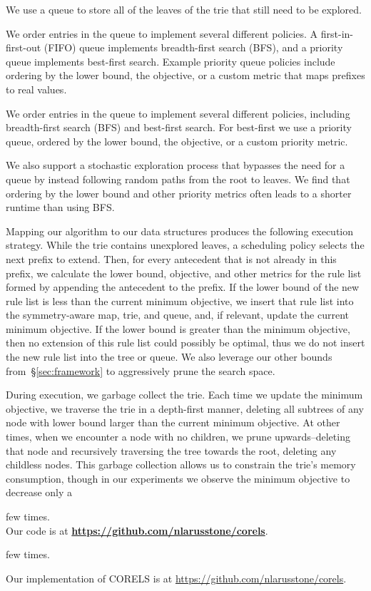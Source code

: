 We use a queue to store all of the leaves of the trie that still need to be explored.
%
\begin{arxiv}
We order entries in the queue to implement several different policies.
%
A first-in-first-out (FIFO) queue implements breadth-first search (BFS),
and a priority queue implements best-first search.
%
Example priority queue policies include ordering
by the lower bound, the objective, or a custom metric
that maps prefixes to real values.
\end{arxiv}
\begin{kdd}
We order entries in the queue to implement several different policies,
including breadth-first search (BFS) and best-first search.
%
For best-first we use a priority queue, ordered by the lower bound, the objective,
or a custom priority metric.
\end{kdd}
%
We also support a stochastic exploration process that bypasses
the need for a queue by instead following random paths from the root to leaves.
%
We find that ordering by the lower bound and other priority metrics
often leads to a shorter runtime than using BFS.


Mapping our algorithm to our data structures produces the following execution strategy.
%
While the trie contains unexplored leaves, a scheduling policy selects the next prefix to extend.
%
Then, for every antecedent that is not already in this prefix, we calculate the lower bound,
objective, and other metrics for the rule list formed by appending the antecedent to the prefix.
%
If the lower bound of the new rule list is less than the current minimum objective, we insert that
rule list into the symmetry-aware map, trie, and queue, and, if relevant, update the
current minimum objective.
%
If the lower bound is greater than the minimum objective,
then no extension of this rule list could possibly be optimal,
thus we do not insert the new rule list into the tree or queue.
%
We also leverage our other bounds from~\S\ref{sec:framework}
to aggressively prune the search space.

During execution, we garbage collect the trie.
%
Each time we update the minimum objective,
we traverse the trie in a depth-first manner, deleting all subtrees
of any node with lower bound larger than the current minimum objective.
%
At other times, when we encounter a node with no children, we prune upwards--deleting that
node and recursively traversing the tree towards the root, deleting any childless nodes.
%
This garbage collection allows us to constrain the trie's memory consumption, though in our
experiments we observe the minimum objective to decrease only a
\begin{kdd}
few times. \\

Our code is at \textbf{\url{https://github.com/nlarusstone/corels}}.
\end{kdd}
\begin{arxiv}
few times.

Our implementation of CORELS is at \url{https://github.com/nlarusstone/corels}.
\end{arxiv}

